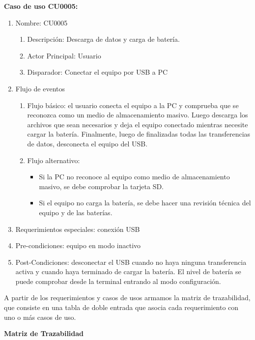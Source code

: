 \textbf{Caso de uso CU0005:}

	\begin{enumerate} 
		\item Nombre: CU0005
		\begin{enumerate} [label*=\arabic*.]
			\item Descripción: Descarga de datos y carga de batería.
			\item Actor Principal: Usuario
			\item Disparador: Conectar el equipo por USB a PC
		\end{enumerate}
		\item Flujo de eventos
		\begin{enumerate} [label*=\arabic*.]
			\item Flujo básico: el usuario conecta el equipo a la PC y comprueba que se reconozca como un medio de almacenamiento masivo. Luego descarga los archivos que sean necesarios y deja el equipo conectado mientras necesite cargar la batería. Finalmente, luego de finalizadas todas las transferencias de datos, desconecta el equipo del USB.
			\item Flujo alternativo:
			\begin{itemize}
				\item Si la PC no reconoce al equipo como medio de almacenamiento masivo, se debe comprobar la tarjeta SD.
				\item Si el equipo no carga la batería, se debe hacer una revisión técnica del equipo y de las baterías.			
			\end{itemize}				
		\end{enumerate}

		\item Requerimientos especiales: conexión USB
		\item Pre-condiciones: equipo en modo inactivo
		\item Post-Condiciones: desconectar el USB cuando no haya ninguna transferencia activa y cuando haya terminado de cargar la batería. El nivel de batería se puede comprobar desde la terminal entrando al modo configuración.
	\end{enumerate}
	
A partir de los requerimientos y casos de usos armamos la matriz de trazabilidad, que consiste en una tabla de doble entrada que asocia cada requerimiento con uno o más casos de uso.

\textbf{Matriz de Trazabilidad}

